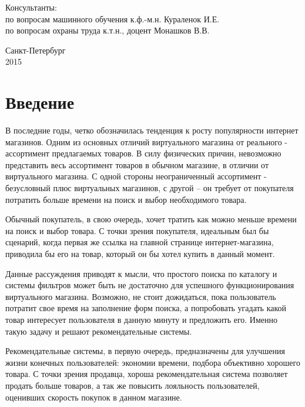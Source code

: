 \documentclass[12pt,a4paper]{report}
\begin{document}
\begin{titlepage}
\begin{center}
\begin{flushleft}
Консультанты:\\
\vspace*{0.3cm}
по вопросам машинного обучения  к.ф.-м.н. \hrulefill Кураленок И.Е.\\
\vspace*{0.3cm}
по вопросам охраны труда к.т.н., доцент \hrulefill Монашков В.В.\\
\end{flushleft}
\vspace{\fill}

\end{center}
\vfill
\begin{center}
{\large Санкт-Петербург \\ 2015}
\end {center}
\end{titlepage}

\tableofcontents %
\pagebreak
\chapter{Введение}
В последние годы, четко обозначилась тенденция к росту популярности интернет магазинов. Одним из основных отличий виртуального магазина от реального - ассортимент предлагаемых товаров. В силу физических причин, невозможно представить весь ассортимент товаров в обычном магазине, в отличии от виртуального магазина. С одной стороны неограниченный ассортимент - безусловный плюс виртуальных магазинов, с другой -- он требует от покупателя потратить больше времени на поиск и выбор необходимого товара.

Обычный покупатель, в свою очередь, хочет тратить как можно меньше времени на поиск и выбор товара. С точки зрения покупателя, идеальным был бы сценарий, когда первая же ссылка на главной странице интернет-магазина, приводила бы его на товар, который он бы хотел купить в данный момент.

Данные рассуждения приводят к мысли, что простого поиска 
по каталогу и системы фильтров может быть не достаточно для успешного функционирования виртуального магазина. Возможно, не стоит дожидаться, пока пользователь потратит свое время на заполнение форм поиска, а попробовать угадать какой товар интересует пользователя в данную минуту и предложить его. Именно такую задачу и решают рекомендательные системы.

Рекомендательные системы, в первую очередь, предназначены для улучшения жизни конечных пользователей: экономии времени, подбора объективно хорошего товара. С точки зрения продавца, хороша рекомендательная система позволяет продать больше товаров, а так же повысить лояльность пользователей, оценивших скорость покупок в данном магазине.
\end{document}
